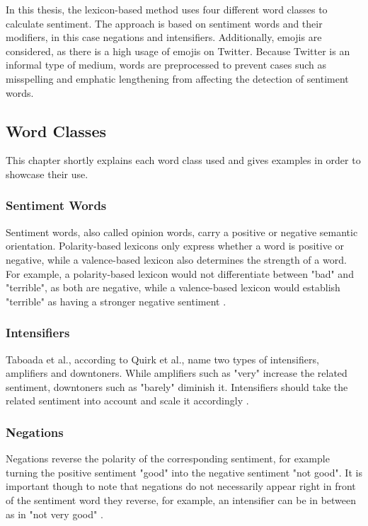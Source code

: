 In this thesis, the lexicon-based method uses four different word classes to calculate sentiment. The approach is based on sentiment words and their modifiers, in this case negations and intensifiers. Additionally, emojis are considered, as there is a high usage of emojis on Twitter. Because Twitter is an informal type of medium, words are preprocessed to prevent cases such as misspelling and emphatic lengthening from affecting the detection of sentiment words.

\subsection{Word Classes}
This chapter shortly explains each word class used and gives examples in order to showcase their use.

\subsubsection{Sentiment Words}
Sentiment words, also called opinion words, carry a positive or negative semantic orientation. Polarity-based lexicons only express whether a word is positive or negative, while a valence-based lexicon also determines the strength of a word. For example, a polarity-based lexicon would not differentiate between "bad" and "terrible", as both are negative, while a valence-based lexicon would establish "terrible" as having a stronger negative sentiment \cite{DBLP:conf/icwsm/HuttoG14}.

\subsubsection{Intensifiers}
Taboada et al., according to Quirk et al., name two types of intensifiers, amplifiers and downtoners. While amplifiers such as "very" increase the related sentiment, downtoners such as "barely" diminish it. Intensifiers should take the related sentiment into account and scale it accordingly \cite{taboada}.

\subsubsection{Negations}
Negations reverse the polarity of the corresponding sentiment, for example turning the positive sentiment "good" into the negative sentiment "not good". It is important though to note that negations do not necessarily appear right in front of the sentiment word they reverse, for example, an intensifier can be in between as in "not very good" \cite{taboada}.

